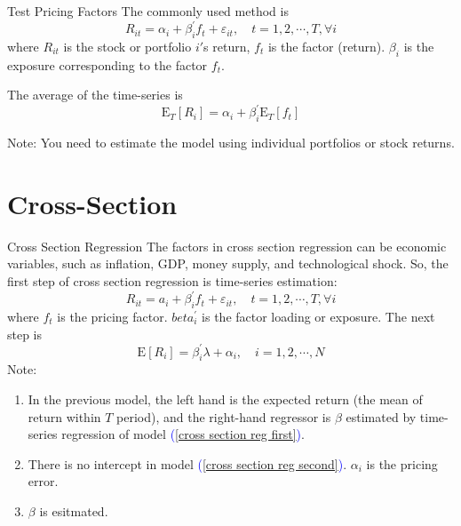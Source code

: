 \documentclass{beamer}
\begin{document}
\begin{frame}{Test Pricing Factors}
	The commonly used method is
	\begin{equation}
		R_{i t}=\alpha_i+\beta_i^{\prime} f_t+\varepsilon_{i t}, \quad t=1,2, \cdots, T, \forall i
    \end{equation}
	where $R_{i t}$ is the stock or portfolio $i$\('\)s return, $f_t$ is the factor (return). $\beta_i$ is the exposure corresponding to the factor $f_t$.

	The average of the time-series is
	\begin{equation}
		\mathrm{E}_T\left[R_i\right]=\alpha_i+\beta_i^{\prime} \mathrm{E}_T\left[f_t\right]
	\end{equation}

Note: You need to estimate the model using individual portfolios or stock returns.

\end{frame}

\section{Cross-Section}

\begin{frame}{Cross Section Regression}
The factors in cross section regression can be economic variables, such as inflation, GDP, money supply, and technological shock. So, the first step of cross section regression is time-series estimation:
\begin{equation}\label{cross section reg first}
	R_{i t}=a_i+\beta_i^{\prime} f_t+\varepsilon_{i t}, \quad t=1,2, \cdots, T, \forall i
\end{equation}
where $f_t$ is the pricing factor. $beta_i^{\prime}$ is the factor loading or exposure. The next step is
\begin{equation}\label{cross section reg second}
	\mathrm{E}\left[R_i\right]=\beta_i^{\prime} \lambda+\alpha_i, \quad i=1,2, \cdots, N
\end{equation}
Note:
\begin{enumerate}
	\item In the previous model, the left hand is the expected return (the mean of return within $T$ period), and the right-hand regressor is $\beta$ estimated by time-series regression of model \textcolor{blue}{(\ref{cross section reg first})}.
	\item There is no intercept in model \textcolor{blue}{(\ref{cross section reg second})}. $\alpha_i$ is the pricing error.
	\item $\beta$ is esitmated.
\end{enumerate}

\end{frame}
\end{document}
